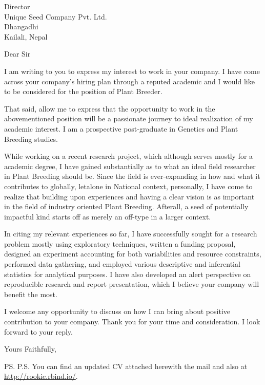 \documentclass{letter}
\begin{document}
\begin{letter}{Director \\ Unique Seed Company Pvt. Ltd. \\ Dhangadhi
\\ Kailali, Nepal}
\opening{Dear Sir}

I am writing to you to express my interest to work in your company. I have come across your company's hiring plan through a reputed academic and I would like to be considered for the position of Plant Breeder.


That said, allow me to express that the opportunity to work in the abovementioned position will be a passionate journey to ideal realization of my academic interest. I am a prospective post-graduate in Genetics and Plant Breeding studies. 

While working on a recent research project, which although serves mostly for a academic degree, I have gained substantially as to what an ideal field researcher in Plant Breeding should be. Since the field is ever-expanding in how and what it contributes to globally, letalone in National context, personally, I have come to realize that building upon experiences and having a clear vision is as important in the field of industry oriented Plant Breeding. Afterall, a seed of potentially impactful kind starts off as merely an off-type in a larger context. 

In citing my relevant experiences so far, I have successfully sought for a research problem mostly using exploratory techniques, written a funding proposal, designed an experiment accounting for both variabilities and resource constraints, performed data gathering, and employed various descriptive and inferential statistics for analytical purposes. I have also developed an alert perspective on reproducible research and report presentation, which I believe your company will benefit the most.

I welcome any opportunity to discuss on how I can bring about positive contribution to your company. Thank you for your time and consideration. I look forward to your reply.

\closing{Yours Faithfully,}

\ps
P.S. You can find an updated CV attached herewith the mail and also at\\
\url{http://rookie.rbind.io/}.

\end{letter}
\end{document}
